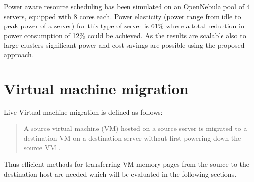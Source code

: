 Power aware resource scheduling has been simulated on an OpenNebula \cite{fontan2008opennebula} pool of 4 servers, equipped with 8 cores each. Power elasticity (power range from idle to peak power of a server) for this type of server is 61\% where a total reduction in power consumption of 12\% could be achieved. As the results are scalable also to large clusters significant power and cost savings are possible using the proposed approach. 


%
%
%
%



\section{Virtual machine migration}


Live Virtual machine migration is defined as follows:
\begin{quote}
A source virtual machine (VM) hosted on a source server is
migrated to a destination VM on a destination server without
first powering down the source VM \cite{nelson2009virtual}.
\end{quote}

Thus efficient methods for transferring VM memory pages from the source to the destination host are needed which will be evaluated in the following sections. 
%


